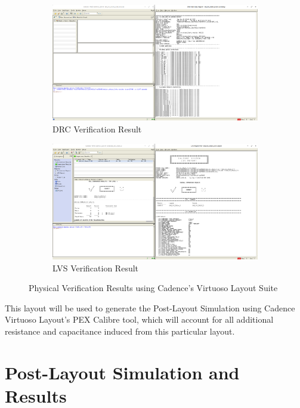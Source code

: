 \documentclass[letterpaper, 11pt]{article}
\begin{document}
\begin{figure}[ht!]
	\centering
	\begin{subfigure}[b]{.48\linewidth}
		\includegraphics[width=\textwidth]{inv_chain_3_drc.png}
		\caption{DRC Verification Result}
		\label{fig5a}
	\end{subfigure}
	\begin{subfigure}[b]{.48\linewidth}
		\includegraphics[width=\textwidth]{inv_chain_3_lvs.png}
		\caption{LVS Verification Result}
		\label{fig5b}
	\end{subfigure}
	\caption{Physical Verification Results using Cadence's Virtuoso Layout Suite}
\end{figure}

This layout will be used to generate the Post-Layout Simulation using Cadence Virtuoso Layout's PEX Calibre tool, which will account for all additional resistance and capacitance induced from this particular layout.


\section{Post-Layout Simulation and Results}
\label{sec:post_layout_simulation_results}
\end{document}
